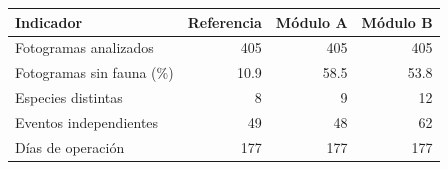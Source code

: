 \begin{tabular}{lrrr}
\toprule
Indicador & Referencia & Módulo A & Módulo B \\
\midrule
Fotogramas analizados & 405 & 405 & 405 \\
Fotogramas sin fauna (\%) & 10.9 & 58.5 & 53.8 \\
Especies distintas & 8 & 9 & 12 \\
Eventos independientes & 49 & 48 & 62 \\
Días de operación & 177 & 177 & 177 \\
\bottomrule
\end{tabular}
